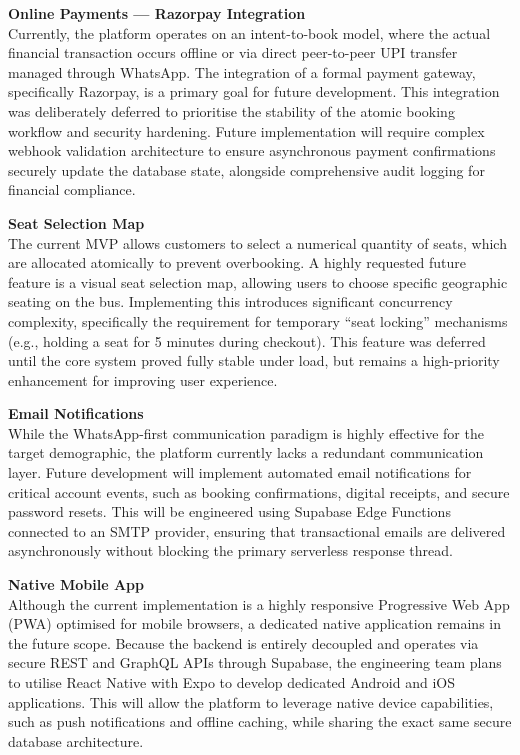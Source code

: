 \documentclass[12pt,a4paper]{report}
\begin{document}
\textbf{Online Payments --- Razorpay Integration}\\
Currently, the platform operates on an intent-to-book model, where the actual financial transaction occurs offline or via direct peer-to-peer UPI transfer managed through WhatsApp. The integration of a formal payment gateway, specifically Razorpay, is a primary goal for future development. This integration was deliberately deferred to prioritise the stability of the atomic booking workflow and security hardening. Future implementation will require complex webhook validation architecture to ensure asynchronous payment confirmations securely update the database state, alongside comprehensive audit logging for financial compliance.

\textbf{Seat Selection Map}\\
The current MVP allows customers to select a numerical quantity of seats, which are allocated atomically to prevent overbooking. A highly requested future feature is a visual seat selection map, allowing users to choose specific geographic seating on the bus. Implementing this introduces significant concurrency complexity, specifically the requirement for temporary ``seat locking'' mechanisms (e.g., holding a seat for 5 minutes during checkout). This feature was deferred until the core system proved fully stable under load, but remains a high-priority enhancement for improving user experience.

\textbf{Email Notifications}\\
While the WhatsApp-first communication paradigm is highly effective for the target demographic, the platform currently lacks a redundant communication layer. Future development will implement automated email notifications for critical account events, such as booking confirmations, digital receipts, and secure password resets. This will be engineered using Supabase Edge Functions connected to an SMTP provider, ensuring that transactional emails are delivered asynchronously without blocking the primary serverless response thread.

\textbf{Native Mobile App}\\
Although the current implementation is a highly responsive Progressive Web App (PWA) optimised for mobile browsers, a dedicated native application remains in the future scope. Because the backend is entirely decoupled and operates via secure REST and GraphQL APIs through Supabase, the engineering team plans to utilise React Native with Expo to develop dedicated Android and iOS applications. This will allow the platform to leverage native device capabilities, such as push notifications and offline caching, while sharing the exact same secure database architecture.
\end{document}
